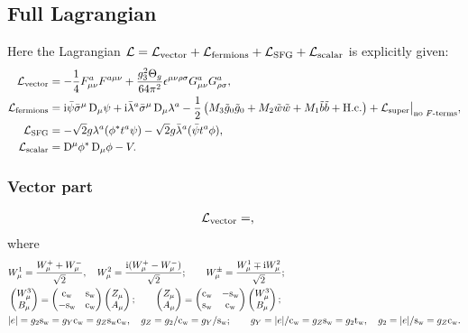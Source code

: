 \documentclass[CheatSheet]{subfiles}
\begin{document}
\subsection{Full Lagrangian}
Here the Lagrangian
 $\mathcal L = \mathcal L_{\mathrm{vector}} + \mathcal L_{\mathrm{fermions}} + \mathcal L_{\mathrm{SFG}} + \mathcal L_{\mathrm{scalar}}$ is explicitly given:
\begin{align}
 \mathcal L_{\mathrm{vector}}&=
- \frac14F^a_{\mu\nu}F^{a\mu\nu}
+ \frac{g_3^2\Theta_g}{64\pi^2}\epsilon^{\mu\nu\rho\sigma}G^a_{\mu\nu}G^a_{\rho\sigma},
\\
 \mathcal L_{\mathrm{fermions}}&=
  \mathrm{i}\bar\psi\bar\sigma^\mu\mathop{}\!\mathrm{D}_\mu\psi
 + \mathrm{i}\bar\lambda^a\bar\sigma^\mu\mathop{}\!\mathrm{D}_\mu\lambda^a
 - \frac12\left(M_3\tilde g_0\tilde g_0+M_2\tilde w\tilde w+M_1\tilde b\tilde b+\text{H.c.}\right)
 + \mathcal L_{\mathrm{super}}\big|_{\text{no $F$-terms}},
\\\mathcal L_{\mathrm{SFG}}&=
 -\sqrt2g\lambda^a(\phi^*t^a\psi) -\sqrt2g\bar\lambda^a(\bar\psi t^a\phi),
\\\mathcal L_{\mathrm{scalar}}&=
\mathop{}\!\mathrm{D}^\mu\phi^*\mathop{}\!\mathrm{D}_\mu\phi - V.
\end{align}
\subsubsection{Vector part}
\begin{align}
\begin{split}
   \mathcal L_{\mathrm{vector}}
 &=
 ,
\end{split}\label{eq:Lvector}
\end{align}
where
\begin{align*}
 &W^1_\mu = \frac{W^+_\mu+W^-_\mu}{\sqrt2},\quad
 W^2_\mu = \frac{\mathrm{i}(W^+_\mu-W^-_\mu)}{\sqrt2};\qquad
 W^\pm_\mu = \frac{W^1_\mu\mp\mathrm{i} W^2_\mu}{\sqrt2};
\\
 &\begin{pmatrix}W^3_\mu\\B_\mu\end{pmatrix} = \begin{pmatrix}\mathrm{c}_{\mathrm w} & \mathrm{s}_{\mathrm w} \\ -\mathrm{s}_{\mathrm w} & \mathrm{c}_{\mathrm w}\end{pmatrix} \begin{pmatrix}Z_\mu \\ A_\mu\end{pmatrix};\qquad
 \begin{pmatrix}Z_\mu\\A_\mu\end{pmatrix} = \begin{pmatrix}\mathrm{c}_{\mathrm w} & -\mathrm{s}_{\mathrm w} \\ \mathrm{s}_{\mathrm w} & \mathrm{c}_{\mathrm w}\end{pmatrix} \begin{pmatrix}W^3_\mu \\ B_\mu\end{pmatrix};\\
 &|e| = g_2\mathrm{s}_{\mathrm w} = g_Y\mathrm{c}_{\mathrm w} = g_Z\mathrm{s}_{\mathrm w}\mathrm{c}_{\mathrm w}, \quad
 g_Z  = g_2/\mathrm{c}_{\mathrm w} = g_Y/\mathrm{s}_{\mathrm w}; \qquad
 g_Y = |e|/\mathrm{c}_{\mathrm w} = g_Z\mathrm{s}_{\mathrm w} = g_2{\mathrm t}_{\mathrm w},\quad
 g_2 = |e|/\mathrm{s}_{\mathrm w} = g_Z\mathrm{c}_{\mathrm w}.
\end{align*}
\end{document}
